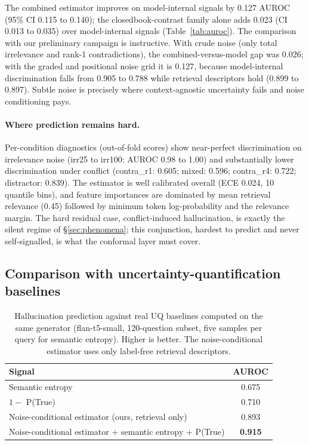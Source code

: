 \documentclass[sn-basic]{sn-jnl}
\theoremstyle{thmstyleone}
\theoremstyle{thmstyletwo}
\begin{document}
The combined estimator improves on model-internal signals by 0.127
AUROC (95\% CI 0.115 to 0.140); the closedbook-contrast family alone
adds 0.023 (CI 0.013 to 0.035) over model-internal signals
(Table~\ref{tab:auroc}). The comparison with our preliminary campaign
is instructive. With crude noise (only total irrelevance and rank-1
contradictions), the combined-versus-model gap was 0.026; with the
graded and positional noise grid it is 0.127, because model-internal
discrimination falls from 0.905 to 0.788 while retrieval descriptors
hold (0.899 to 0.897). Subtle noise is precisely where context-agnostic
uncertainty fails and noise conditioning pays.

\paragraph{Where prediction remains hard.}
Per-condition diagnostics (out-of-fold scores) show near-perfect
discrimination on irrelevance noise (irr25 to irr100: AUROC 0.98 to
1.00) and substantially lower discrimination under conflict
(contra\_r1: 0.605; mixed: 0.596; contra\_r4: 0.722; distractor:
0.839). The estimator is well calibrated overall (ECE 0.024, 10
quantile bins), and feature importances are dominated by mean retrieval
relevance (0.45) followed by minimum token log-probability and the
relevance margin. The hard residual case, conflict-induced
hallucination, is exactly the silent regime of
\S\ref{sec:phenomena}; this conjunction, hardest to predict and never
self-signalled, is what the conformal layer must cover.

\subsection{Comparison with uncertainty-quantification baselines}
\label{sec:baselines}

\begin{table}[tbp]
\centering\small
\caption{Hallucination prediction against real UQ baselines computed on the
same generator (flan-t5-small, 120-question subset, five samples per query
for semantic entropy). Higher is better. The noise-conditional estimator
uses only label-free retrieval descriptors.}
\label{tab:baselines}
\begin{tabular}{lc}
\toprule
Signal & AUROC \\
\midrule
Semantic entropy \citep{kuhn2023semantic,farquhar2024nature} & 0.675 \\
$1 - $ P(True) \citep{kadavath2022language}                      & 0.710 \\
Noise-conditional estimator (ours, retrieval only)           & 0.893 \\
Noise-conditional estimator $+$ semantic entropy $+$ P(True) & \textbf{0.915} \\
\bottomrule
\end{tabular}
\end{table}
\end{document}
